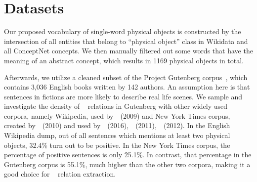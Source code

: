 \section{Datasets}
\label{sec:data}
\vspace{-10pt}
Our proposed vocabulary of single-word physical objects is constructed by the intersection of all entities that belong to ``physical object'' class in Wikidata and 
all ConceptNet concepts. 
We then manually filtered out some 
words that have the meaning of an abstract concept, which 
results in 1169 physical objects in total.

Afterwards, we utilize a cleaned subset of the Project Gutenberg corpus~\cite{lahiri:2014:SRW}, which contains 3,036 English books written by 142 authors.
% 
An assumption here is that sentences in fictions are more likely to describe real life scenes. 
We sample and investigate the density of \lnear~ relations in Gutenberg with other 
widely used corpora, namely Wikipedia, 
used by~\citeauthor{mintz2009distant}~(2009) and New York Times corpus, 
created by~\citeauthor{riedel2010modeling}~(2010) and 
used by~\citeauthor{Lin2016NeuralRE}~(2016),~\citeauthor{hoffmann2011knowledge}~(2011),~\citeauthor{surdeanu2012multi}~(2012). 
In the English Wikipedia dump, out of all sentences which mentions at least two
physical objects, 32.4\% turn out to be positive. 
In the New York Times corpus,
the percentage of positive sentences is only 25.1\%. 
In contrast, that percentage in the Gutenberg corpus is 55.1\%, much higher 
than the other two corpora, making it a good choice for \lnear~ 
relation extraction.

